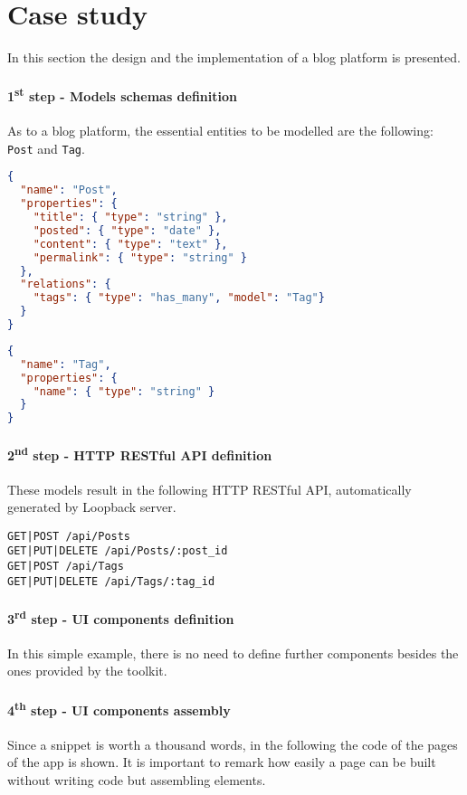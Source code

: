 \section{Case study}\label{sec:case-study}
In this section the design and the implementation of a blog platform is presented. 

\paragraph{1\textsuperscript{st} step - Models schemas definition}
As to a blog platform, the essential entities to be modelled are the following: \texttt{Post} and \texttt{Tag}.

\begin{lstlisting}[language=json]
{
  "name": "Post",
  "properties": {
    "title": { "type": "string" },
    "posted": { "type": "date" },
    "content": { "type": "text" },
    "permalink": { "type": "string" }
  }, 
  "relations": {
    "tags": { "type": "has_many", "model": "Tag"}
  }
}
\end{lstlisting}

\begin{lstlisting}[language=json]
{
  "name": "Tag",
  "properties": {
    "name": { "type": "string" }
  }
}
\end{lstlisting}

\paragraph{2\textsuperscript{nd} step - HTTP RESTful API definition}
These models result in the following HTTP RESTful API, automatically generated by Loopback server.

\begin{lstlisting}
GET|POST /api/Posts
GET|PUT|DELETE /api/Posts/:post_id
GET|POST /api/Tags
GET|PUT|DELETE /api/Tags/:tag_id
\end{lstlisting} 

\paragraph{3\textsuperscript{rd} step - UI components definition}
In this simple example, there is no need to define further components besides the ones provided by the  toolkit.

\paragraph{4\textsuperscript{th} step - UI components assembly}
Since a snippet is worth a thousand words, in the following the code of the pages of the app is shown.
It is important to remark how easily a page can be built without writing code but assembling elements.

